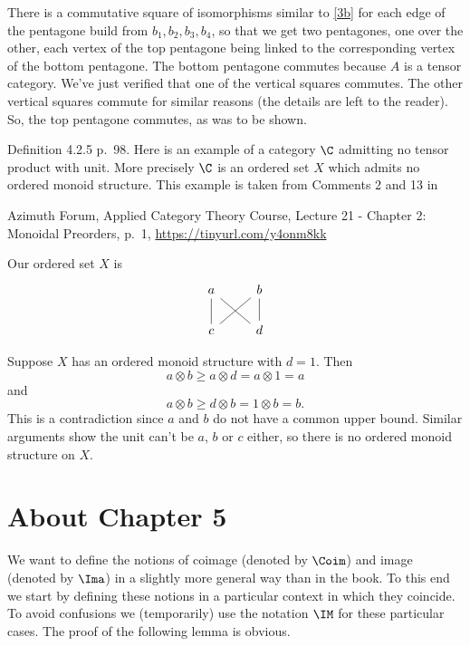 \documentclass[12pt]{article}
\theoremstyle{remark}
\theoremstyle{definition}
\begin{document}
\begin{s}
There is a commutative square of isomorphisms similar to \eqref{3b} for each edge of the pentagone build from $b_1,b_2,b_3,b_4$, so that we get two pentagones, one over the other, each vertex of the top pentagone being linked to the corresponding vertex of the bottom pentagone. The bottom pentagone commutes because $A$ is a tensor category. We've just verified that one of the vertical squares commutes. The other vertical squares commute for similar reasons (the details are left to the reader). So, the top pentagone commutes, as was to be shown.
\end{s} 

\begin{s}
Definition 4.2.5 p.~98. Here is an example of a category $\C$ admitting no tensor product with unit. More precisely $\C$ is an ordered set $X$ which admits no ordered monoid structure. This example is taken from Comments 2 and 13 in

\noindent Azimuth Forum,  Applied Category Theory Course, Lecture 21 - Chapter 2: Mon\-oid\-al Preorders, p.~1, \href{https://tinyurl.com/y4onm8kk}{https://tinyurl.com/y4onm8kk}

Our ordered set $X$ is 
$$
\begin{tikzcd}
a\ar[d,dash]\ar[dr,dash]&b\ar[d,dash]\ar[dl,dash]\\
c&d
\end{tikzcd}
$$ 
\end{s}

Suppose $X$ has an ordered monoid structure with $d=1$.  Then 
$$
a\otimes b\ge a\otimes d=a\otimes1=a
$$
and 
$$
a\otimes b\ge d\otimes b=1\otimes b=b.
$$
This is a contradiction since $a$ and $b$ do not have a common upper bound. Similar arguments show the unit can't be $a$, $b$ or $c$ either, so there is no ordered monoid structure on $X$. 


\section{About Chapter 5}


We want to define the notions of coimage (denoted by $\Coim$) and image (denoted by $\Ima$) in a slightly more general way than in the book. To this end we start by defining these notions in a particular context in which they coincide. To avoid confusions we (temporarily) use the notation $\IM$ for these particular cases. The proof of the following lemma is obvious. 
\end{document}

